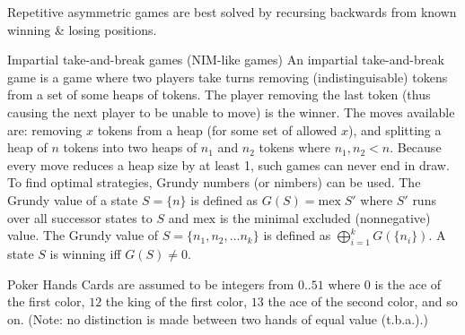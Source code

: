 \categorycontents{}


Repetitive asymmetric games are best solved by recursing backwards from
known winning \& losing positions.


\begin{algorithm}{Impartial take-and-break games (NIM-like games)}
\desc
An impartial take-and-break game is a game where two players take
turns removing (indistinguisable) tokens from a set of some heaps of
tokens.  The player removing the last token (thus causing the next
player to be unable to move) is the winner.  The moves available are:
removing $x$ tokens from a heap (for some set of allowed $x$), and
splitting a heap of $n$ tokens into two heaps of $n_1$ and $n_2$
tokens where $n_1, n_2 < n$.  Because every move reduces a heap size
by at least 1, such games can never end in draw.  To find optimal
strategies, Grundy numbers (or nimbers) can be used.  The Grundy value
of a state $S = \{n\}$ is defined as $G(S) =
\mathrm{mex}\;S'$ where $S'$ runs over all successor states to $S$ and
$\mathrm{mex}$ is the minimal excluded (nonnegative) value.  The
Grundy value of $S =
\{n_1, n_2, \ldots n_k\}$ is defined as $\bigoplus_{i=1}^{k}
G(\{n_i\})$.  A state $S$ is winning iff $G(S) \ne 0$.

\end{algorithm}


\begin{algorithm}{Poker Hands}
\desc
Cards are assumed to be integers from $0..51$ where $0$ is the ace of
the first color, $12$ the king of the first color, $13$ the ace of the
second color, and so on.  (Note: no distinction is made between two
hands of equal value (t.b.a.).)

\end{algorithm}


\begin{sourceslandscape}
\end{sourceslandscape}
